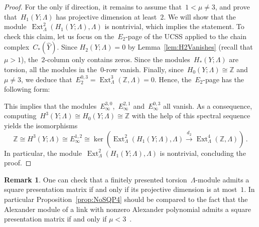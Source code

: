 \documentclass[10.9pt,a4paper]{amsart}
\theoremstyle{definition}
\newtheorem{remark}[theorem]{Remark}
\theoremstyle{remark}
\newcommand{\Z}{\mathbb{Z}}
\newcommand{\Ext}{\operatorname{Ext}}
\begin{document}
\begin{proof}
For the only if direction, it remains to assume that~$1<\mu\ne 3$,
and prove that~$H_1(Y;\Lambda)$ has projective dimension
at least~$2$.
We will show that the module~$\Ext_\Lambda^{2}(H_1(Y;\Lambda),\Lambda)$ is nontrivial, which implies the statement.
To check this claim, let us focus on the~$E_2$-page of the UCSS applied to the chain complex~$C_*(\widehat{Y})$. 
Since $H_2(Y;\Lambda) = 0$ by Lemma~\ref{lem:H2Vanishes} (recall that~$\mu>1$), the~$2$-column only contains zeros. 
Since the modules~$H_\ast(Y;\Lambda)$ are torsion,  all the modules in the~$0$-row vanish.
Finally, since~$H_0(Y;\Lambda)\cong\Z$ and~$\mu\neq 3$,  we deduce that~$E_2^{0,3}=\Ext^3_\Lambda(\Z,\Lambda) =0$. Hence, the~$E_2$-page has the following form:
\begin{center}
\end{center}
This implies that the modules~$E^{3,0}_\infty$,~$E^{2,1}_\infty$ and~$E^{0,3}_\infty$
all vanish. As a consequence,
computing~$H^3(Y;\Lambda)\cong H_0(Y;\Lambda)\cong\Z$ with the help of this spectral sequence
yields the isomorphisms
\[
\Z\cong H^3(Y;\Lambda)\cong E_\infty^{1,2} \cong \ker(\Ext_\Lambda^2(H_1(Y;\Lambda),\Lambda) \stackrel{d_2}{\longrightarrow} \Ext^4_\Lambda(\Z,\Lambda))\,.
\]
In particular, the module~$\Ext_\Lambda^2(H_1(Y;\Lambda),\Lambda)$ is nontrivial, concluding the proof.
\end{proof}

\begin{remark}
\label{rem:proj-dim-1}
One can check that a finitely presented torsion~$\Lambda$-module admits a square presentation matrix if and only if its projective dimension is at most~$1$.
In particular Proposition~\ref{prop:NoSQP4} should be compared to the fact that the Alexander module of a link with nonzero Alexander polynomial admits a square presentation matrix if and only if $\mu <3$~\cite{CrowellStrauss}.
\end{remark}
\end{document}
